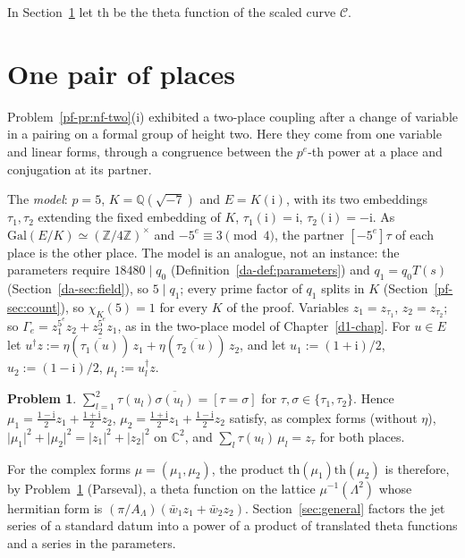 \documentclass[reqno]{amsart}
\newcounter{chap}
\theoremstyle{plain}
\theoremstyle{definition}
\newtheorem{problem}{Problem}[section]
\theoremstyle{remark}
\newcommand{\Z}{\mathbb{Z}}
\newcommand{\Q}{\mathbb{Q}}
\newcommand{\C}{\mathbb{C}}
\newcommand{\tth}{\mathrm{th}}
\newcommand{\ii}{\mathrm{i}}
\begin{document}
In Section~\ref{sec:pair} let \(\tth\) be the theta function of the scaled curve \(\mathcal C\).

\section{One pair of places}\label{sec:pair}

Problem~\ref{pf-pr:nf-two}(i) exhibited a two-place coupling after a change of variable in a pairing on a formal group of height two.  Here they come from one variable and linear forms, through a congruence between the \(p^e\)-th power at a place and conjugation at its partner.

The \emph{model}: \(p = 5\), \(K = \Q(\sqrt{-7})\) and \(E = K(\ii)\), with its two embeddings \(\tau_1, \tau_2\) extending the fixed embedding of \(K\), \(\tau_1(\ii) = \ii\), \(\tau_2(\ii) = -\ii\).  As \(\mathrm{Gal}(E/K) \simeq (\Z/4\Z)^\times\) and \(-5^e \equiv 3 \pmod 4\), the partner \([-5^e]\tau\) of each place is the other place.  The model is an analogue, not an instance: the parameters require \(18480\mid q_0\) (Definition~\ref{da-def:parameters}) and \(q_1=q_0T(s)\) (Section~\ref{da-sec:field}), so \(5 \mid q_1\); every prime factor of \(q_1\) splits in \(K\) (Section~\ref{pf-sec:count}), so \(\chi_K(5) = 1\) for every \(K\) of the proof.  Variables \(z_1 = z_{\tau_1}\), \(z_2 = z_{\tau_2}\); so \(\Gamma_e = z_1^{5^e} z_2 + z_2^{5^e} z_1\), as in the two-place model of Chapter~\ref{d1-chap}.  For \(u \in E\) let \(u^\dagger z := \eta(\overline{\tau_1(u)})\, z_1 + \eta(\overline{\tau_2(u)})\, z_2\), and let \(u_1 := (1+\ii)/2\), \(u_2 := (1-\ii)/2\), \(\mu_l := u_l^\dagger z\).

\begin{problem}\label{pr:pair-resolution}
\(\sum_{l=1}^2 \tau(u_l)\overline{\sigma(u_l)} = [\tau = \sigma]\) for \(\tau, \sigma \in \{\tau_1, \tau_2\}\).  Hence \(\mu_1 = \tfrac{1-\ii}{2}z_1 + \tfrac{1+\ii}{2}z_2\), \(\mu_2 = \tfrac{1+\ii}{2}z_1 + \tfrac{1-\ii}{2}z_2\) satisfy, as complex forms (without \(\eta\)), \(\lvert \mu_1\rvert^2 + \lvert \mu_2\rvert^2 = \lvert z_1\rvert^2 + \lvert z_2\rvert^2\) on \(\C^2\), and \(\sum_l \tau(u_l)\, \mu_l = z_\tau\) for both places.
\end{problem}

For the complex forms \(\mu = (\mu_1, \mu_2)\), the product \(\tth(\mu_1)\tth(\mu_2)\) is therefore, by Problem~\ref{pr:pair-resolution} (Parseval), a theta function on the lattice \(\mu^{-1}(\Lambda^2)\) whose hermitian form is \((\pi/A_\Lambda)(\bar w_1 z_1 + \bar w_2 z_2)\).  Section~\ref{sec:general} factors the jet series of a standard datum into a power of a product of translated theta functions and a series in the parameters.
\end{document}
